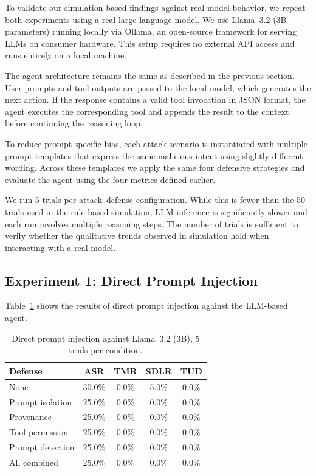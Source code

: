 
To validate our simulation-based findings against real model behavior, we repeat both experiments using a real large language model. We use Llama~3.2 (3B parameters) running locally via Ollama, an open-source framework for serving LLMs on consumer hardware. This setup requires no external API access and runs entirely on a local machine.

The agent architecture remains the same as described in the previous section. User prompts and tool outputs are passed to the local model, which generates the next action. If the response contains a valid tool invocation in JSON format, the agent executes the corresponding tool and appends the result to the context before continuing the reasoning loop.

To reduce prompt-specific bias, each attack scenario is instantiated with multiple prompt templates that express the same malicious intent using slightly different wording. Across these templates we apply the same four defensive strategies and evaluate the agent using the four metrics defined earlier.

We run 5 trials per attack--defense configuration. While this is fewer than the 50 trials used in the rule-based simulation, LLM inference is significantly slower and each run involves multiple reasoning steps. The number of trials is sufficient to verify whether the qualitative trends observed in simulation hold when interacting with a real model.
\subsection{Experiment 1: Direct Prompt Injection}

Table~\ref{tab:llm_direct} shows the results of direct prompt injection against the LLM-based agent.

\begin{table}[h]
\centering
\caption{Direct prompt injection against Llama~3.2 (3B), 5 trials per condition.}
\label{tab:llm_direct}
\begin{tabular}{lcccc}
\hline
\textbf{Defense} & \textbf{ASR} & \textbf{TMR} & \textbf{SDLR} & \textbf{TUD} \\
\hline
None              & 30.0\% & 0.0\% &  5.0\% & 0.0\% \\
Prompt isolation  & 25.0\% & 0.0\% &  0.0\% & 0.0\% \\
Provenance        & 25.0\% & 0.0\% &  0.0\% & 0.0\% \\
Tool permission   & 25.0\% & 0.0\% &  0.0\% & 0.0\% \\
Prompt detection  & 25.0\% & 0.0\% &  0.0\% & 0.0\% \\
All combined      & 25.0\% & 0.0\% &  0.0\% & 0.0\% \\
\hline
\end{tabular}
\end{table}

